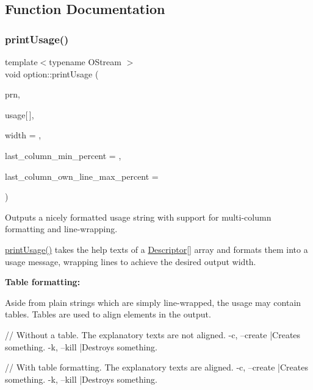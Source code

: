 \subsection{Function Documentation}
\mbox{\label{namespaceoption_afc8bb7e040a98a0b33ff1ce9da1be0d1}} 
\subsubsection{\texorpdfstring{print\+Usage()}{printUsage()}}
{\footnotesize\ttfamily template$<$typename O\+Stream $>$ \\
void option\+::print\+Usage (\begin{DoxyParamCaption}\item[{O\+Stream \&}]{prn,  }\item[{const \hyperlink{structoption_1_1_descriptor}{Descriptor}}]{usage\mbox{[}$\,$\mbox{]},  }\item[{int}]{width = {},  }\item[{int}]{last\+\_\+column\+\_\+min\+\_\+percent = {},  }\item[{int}]{last\+\_\+column\+\_\+own\+\_\+line\+\_\+max\+\_\+percent = {} }\end{DoxyParamCaption})}



Outputs a nicely formatted usage string with support for multi-\/column formatting and line-\/wrapping. 

\hyperlink{namespaceoption_afc8bb7e040a98a0b33ff1ce9da1be0d1}{print\+Usage()} takes the {\ttfamily help} texts of a \hyperlink{structoption_1_1_descriptor}{Descriptor}\mbox{[}\mbox{]} array and formats them into a usage message, wrapping lines to achieve the desired output width.

{\bfseries Table formatting\+:}

Aside from plain strings which are simply line-\/wrapped, the usage may contain tables. Tables are used to align elements in the output.


\begin{DoxyCode}
\textcolor{comment}{// Without a table. The explanatory texts are not aligned.}
-c, --create  |Creates something.
-k, --kill  |Destroys something.

\textcolor{comment}{// With table formatting. The explanatory texts are aligned.}
-c, --create  |Creates something.
-k, --kill    |Destroys something.
\end{DoxyCode}


